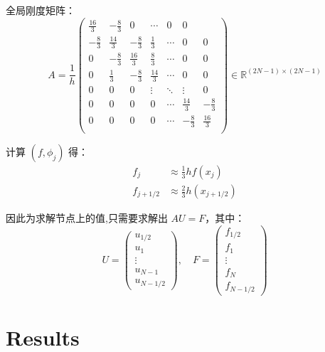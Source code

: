 \documentclass{ctexart}
\begin{document}
全局刚度矩阵：
\begin{equation}
    A = \frac{1}{h}\begin{pmatrix}
          \frac{16}{3} & -\frac{8}{3} & 0 & \cdots   & 0 & 0 \\
         -\frac{8}{3}  & \frac{14}{3} & -\frac{8}{3} & \frac{1}{3} & \cdots &0 & 0\\
         0             & -\frac{8}{3} & \frac{16}{3} & \frac{8}{3} & \cdots & 0 & 0\\
         0             & \frac{1}{3}  & -\frac{8}{3} & \frac{14}{3} & \cdots & 0 & 0\\
          0 & 0 & 0 & \vdots & \ddots & \vdots &0 \\
          0 & 0 & 0 & 0&  \cdots& \frac{14}{3} & -\frac{8}{3}\\
          0 & 0 & 0 & 0& \cdots& -\frac{8}{3} & \frac{16}{3}\\
    \end{pmatrix}\in \mathbb{R}^{(2N -1) \times (2N-1)}
\end{equation}

计算 $(f, \phi_j)$ 得：
\begin{equation}
\begin{aligned}
    f_j &\approx \frac{1}{3} h f(x_j)\\
    f_{j+1/2} & \approx \frac{2}{3} h(x_{j+1/2})
\end{aligned}
\end{equation}

因此为求解节点上的值,只需要求解出 $A U = F$，其中：
\begin{equation}
    U  = \begin{pmatrix}
        u_{1/2}\\
        u_1\\
        \vdots\\
        u_{N-1}\\
        u_{N-1/2}
    \end{pmatrix},
    \quad
    F = \begin{pmatrix}
        f_{1/2}\\
        f_1\\
        \vdots\\
        f_N\\
        f_{N-1/2}
    \end{pmatrix}
\end{equation}


\section{Results}
\end{document}
